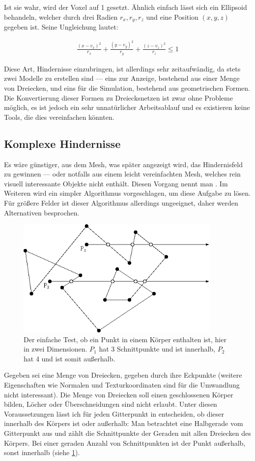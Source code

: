 Ist sie wahr, wird der Voxel auf 1 gesetzt. Ähnlich einfach lässt sich
ein Ellipsoid behandeln, welcher durch drei Radien $r_x,r_y,r_z$ und eine
Position $(x,y,z)$ gegeben ist. Seine Ungleichung lautet:

\begin{align}
\frac{{(x-v_x)}^2}{r_x} + \frac{{(y-v_y)}^2}{r_y} + \frac{{(z-v_z)}^2}{r_z} \leq 1
\end{align}

Diese Art, Hindernisse einzubringen, ist allerdings sehr
zeitaufwändig, da stets zwei Modelle zu erstellen sind --- eins zur
Anzeige, bestehend aus einer Menge von Dreiecken, und eins für die
Simulation, bestehend aus geometrischen Formen. Die Konvertierung dieser
Formen zu Dreiecksnetzen ist zwar ohne Probleme möglich, es ist jedoch
ein sehr unnatürlicher Arbeitsablauf und es existieren keine Tools,
die dies vereinfachen könnten.

\subsection{Komplexe Hindernisse}

Es wäre günstiger, aus dem Mesh, was später angezeigt wird, das
Hindernisfeld zu gewinnen --- oder notfalls aus einem leicht
vereinfachten Mesh, welches rein visuell interessante Objekte nicht
enthält. Diesen Vorgang nennt man . Im
Weiteren wird ein simpler Algorithmus vorgeschlagen, um diese Aufgabe
zu lösen. Für größere Felder ist dieser Algorithmus allerdings
ungeeignet, daher werden Alternativen besprochen.
\begin{figure}[h]
\centering
\includegraphics[width=10cm]{images/point_in_polygon}
\caption{Der einfache Test, ob ein Punkt in einem Körper enthalten ist, hier in zwei Dimensionen. $P_1$ hat 3 Schnittpunkte und ist innerhalb, $P_2$ hat 4 und ist somit außerhalb.}
\label{fig:implementation_boundaries_point_in_polygon}
\end{figure}
Gegeben sei eine Menge von Dreiecken, gegeben durch ihre Eckpunkte
(weitere Eigenschaften wie Normalen und Texturkoordinaten sind für die
Umwandlung nicht interessant). Die Menge von Dreiecken soll einen
geschlossenen Körper bilden, Löcher oder Überschneidungen sind nicht
erlaubt. Unter diesen Voraussetzungen lässt ich für jeden Gitterpunkt
in  entscheiden, ob dieser innerhalb des
Körpers ist oder außerhalb: Man betrachtet eine Halbgerade vom
Gitterpunkt aus und zählt die Schnittpunkte der Geraden mit allen
Dreiecken des Körpers. Bei einer geraden Anzahl von Schnittpunkten ist
der Punkt außerhalb, sonst innerhalb (siehe
\cref{fig:implementation_boundaries_point_in_polygon}).

